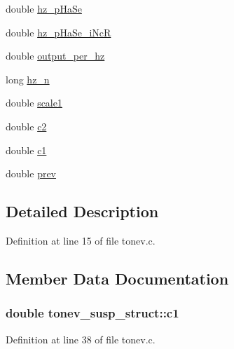 \begin{DoxyCompactItemize}
\item 
double \hyperlink{structtonev__susp__struct_a7ab11a4eab590104115a1976cb86127e}{hz\+\_\+p\+Ha\+Se}
\item 
double \hyperlink{structtonev__susp__struct_a79eb47f7fe42cd41b77f2330cbc0403a}{hz\+\_\+p\+Ha\+Se\+\_\+i\+NcR}
\item 
double \hyperlink{structtonev__susp__struct_af381b352d0ef2bb1b44ce047a5fc7c42}{output\+\_\+per\+\_\+hz}
\item 
long \hyperlink{structtonev__susp__struct_a49e892432be0a51d93f26c3b489cf1f4}{hz\+\_\+n}
\item 
double \hyperlink{structtonev__susp__struct_adfedfdbcd42446fe6c17d49752bac7ff}{scale1}
\item 
double \hyperlink{structtonev__susp__struct_afd70a673ea56aaf7b73faa6eb2fff510}{c2}
\item 
double \hyperlink{structtonev__susp__struct_aaa7fa3517c9e75b7659e1116f0a3dfdc}{c1}
\item 
double \hyperlink{structtonev__susp__struct_adf37cf6ef77d0db354a7be097f336e5a}{prev}
\end{DoxyCompactItemize}


\subsection{Detailed Description}


Definition at line 15 of file tonev.\+c.



\subsection{Member Data Documentation}
\subsubsection[{\texorpdfstring{c1}{c1}}]{\setlength{\rightskip}{0pt plus 5cm}double tonev\+\_\+susp\+\_\+struct\+::c1}\hypertarget{structtonev__susp__struct_aaa7fa3517c9e75b7659e1116f0a3dfdc}{}\label{structtonev__susp__struct_aaa7fa3517c9e75b7659e1116f0a3dfdc}


Definition at line 38 of file tonev.\+c.

